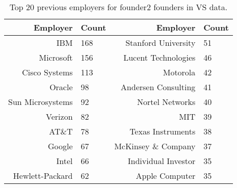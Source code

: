 \begin{table}[]
\centering
\begingroup\normalsize
\begin{tabular}{rlrl}
  \toprule
Employer & Count & Employer & Count \\ 
  \midrule
IBM & 168 & Stanford University & 51 \\ 
  Microsoft & 156 & Lucent Technologies & 46 \\ 
  Cisco Systems & 113 & Motorola & 42 \\ 
  Oracle & 98 & Andersen Consulting & 41 \\ 
  Sun Microsystems & 92 & Nortel Networks & 40 \\ 
  Verizon & 82 & MIT & 39 \\ 
  AT\&T & 78 & Texas Instruments & 38 \\ 
  Google & 67 & McKinsey \& Company & 37 \\ 
  Intel & 66 & Individual Investor & 35 \\ 
  Hewlett-Packard & 62 & Apple Computer & 35 \\ 
   \bottomrule
\end{tabular}
\endgroup
\caption{Top 20 previous employers for founder2 founders in VS data.} 
\label{table:VS_previousEmployersNoPositionsSummaryTable}
\end{table}
